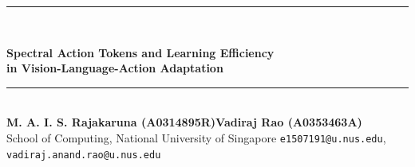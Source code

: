 \documentclass[10pt]{article}
\begin{document}
\begin{center}
  \rule{\linewidth}{2.0pt}\\[5pt]
  {\Large\bfseries Spectral Action Tokens and Learning Efficiency\\in Vision-Language-Action Adaptation\par}
  \vspace{4pt}
  \rule{\linewidth}{0.7pt}\\[6pt]
  {\normalsize\bfseries M. A. I. S. Rajakaruna (A0314895R)\quad\quad Vadiraj Rao (A0353463A)}\\[2pt]
  {\small School of Computing, National University of Singapore \quad
  \texttt{e1507191@u.nus.edu}, \texttt{vadiraj.anand.rao@u.nus.edu}}
\end{center}
\vspace{2pt}
\end{document}
